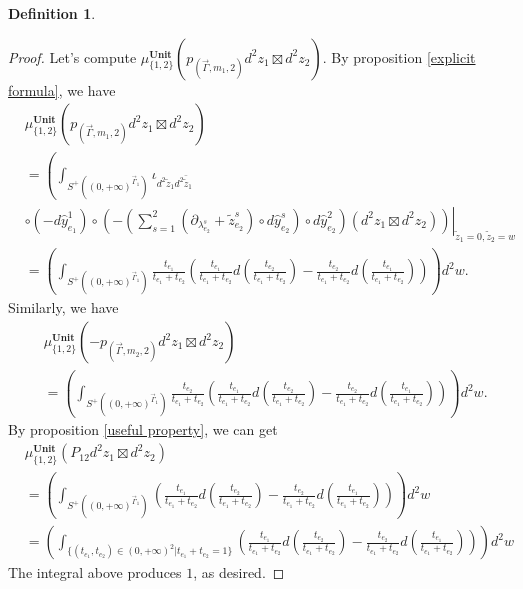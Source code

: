 \documentclass[11pt]{amsart}
\theoremstyle{definition}
\newtheorem{defn}[thm]{Definition}
\theoremstyle{remark}
\numberwithin{equation}{section}
\begin{document}
\begin{defn}
\begin{proof}
        Let's compute $\mu^{\mathbf{Unit}}_{\{1,2\}}(p_{(\vec{\Gamma},m_{1},2)}d^{2}z_{1}\boxtimes d^{2}z_{2})$. By proposition \ref{explicit formula}, we have
        \begin{align*}
            &\mu^{\mathbf{Unit}}_{\{1,2\}}(p_{(\vec{\Gamma},m_{1},2)}d^{2}z_{1}\boxtimes d^{2}z_{2})\\
            &=\left(\int_{S^{+}((0,+\infty)^{\vec{\Gamma}_{1}})}
        \iota_{d^{2}\tilde{z}_{1}d^{2}\bar{\tilde{z}}_{1}}\right.\\
        &\left.\left.\circ (-d\hat{y}_{e_{1}}^{1})\circ(-(\sum_{s=1}^{2}(\partial_{\lambda_{e_{2}}^{s}}+\tilde{z}_{e_{2}}^{s})\circ d\hat{y}_{e_{2}}^{s})\circ d\hat{y}_{e_{2}}^{2})
        (d^{2}z_{1}\boxtimes d^{2}z_{2})\right)\right|_{\tilde{z}_{1}=0,\tilde{z}_{2}=w}\\
        &=
        \left(\int_{S^{+}((0,+\infty)^{\vec{\Gamma}_{1}})}\frac{t_{e_{1}}}{t_{e_{1}}+t_{e_{2}}}\left(\frac{t_{e_{1}}}{t_{e_{1}}+t_{e_{2}}}d(\frac{t_{e_{2}}}{t_{e_{1}}+t_{e_{2}}})-\frac{t_{e_{2}}}{t_{e_{1}}+t_{e_{2}}}d(\frac{t_{e_{1}}}{t_{e_{1}}+t_{e_{2}}})\right)\right)d^{2}w.
        \end{align*}
        Similarly, we have
        \begin{align*}
            &\mu^{\mathbf{Unit}}_{\{1,2\}}(-p_{(\vec{\Gamma},m_{2},2)}d^{2}z_{1}\boxtimes d^{2}z_{2})\\
            &=
        \left(\int_{S^{+}((0,+\infty)^{\vec{\Gamma}_{1}})}\frac{t_{e_{2}}}{t_{e_{1}}+t_{e_{2}}}\left(\frac{t_{e_{1}}}{t_{e_{1}}+t_{e_{2}}}d(\frac{t_{e_{2}}}{t_{e_{1}}+t_{e_{2}}})-\frac{t_{e_{2}}}{t_{e_{1}}+t_{e_{2}}}d(\frac{t_{e_{1}}}{t_{e_{1}}+t_{e_{2}}})\right)\right)d^{2}w.
        \end{align*}
        By proposition \ref{useful property}, we can get
        \begin{align*}
            &\mu^{\mathbf{Unit}}_{\{1,2\}}(P_{12}d^{2}z_{1}\boxtimes d^{2}z_{2})\\
            &=
        \left(\int_{S^{+}((0,+\infty)^{\vec{\Gamma}_{1}})}\left(\frac{t_{e_{1}}}{t_{e_{1}}+t_{e_{2}}}d(\frac{t_{e_{2}}}{t_{e_{1}}+t_{e_{2}}})-\frac{t_{e_{2}}}{t_{e_{1}}+t_{e_{2}}}d(\frac{t_{e_{1}}}{t_{e_{1}}+t_{e_{2}}})\right)\right)d^{2}w\\
        &=\left(\int_{\{(t_{e_{1}},t_{e_{2}})\in (0,+\infty)^2|t_{e_{1}}+t_{e_{2}}=1\}}\left(\frac{t_{e_{1}}}{t_{e_{1}}+t_{e_{2}}}d(\frac{t_{e_{2}}}{t_{e_{1}}+t_{e_{2}}})-\frac{t_{e_{2}}}{t_{e_{1}}+t_{e_{2}}}d(\frac{t_{e_{1}}}{t_{e_{1}}+t_{e_{2}}})\right)\right)d^{2}w
        \end{align*}
        The integral above produces $1$, as desired.
    \end{proof}
\end{defn}
\iffalse
\end{document}
